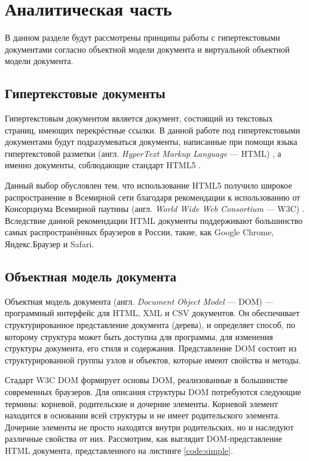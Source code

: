 \section{Аналитическая часть} \label{analysis}

В данном разделе будут рассмотрены принципы работы с гипертекстовыми документами согласно объектной модели документа и виртуальной объектной модели документа.

\subsection{Гипертекстовые документы}

Гипертекстовым \cite{hypertext} документом является документ, состоящий из текстовых страниц, имеющих перекрёстные ссылки. 
В данной работе под гипертекстовыми документами будут подразумеваться документы, написанные при помощи языка гипертекстовой разметки (англ. \textit{HyperText Markup Language} --- HTML) \cite{html}, а именно документы, соблюдающие стандарт HTML5 \cite{html-doc}.


Данный выбор обусловлен тем, что использование HTML5 получило широкое распространение в Всемирной сети \cite{internet} благодаря рекомендации \cite{html-recommendation} к использованию от Консорциума Всемирной паутины (англ. \textit{World Wide Web \newline Consortium} --- W3C) \cite{w3c}.
Вследствие данной рекомендации HTML документы поддерживают большинство самых распространённых браузеров в России, такие, как Google Chrome, Яндекс.Браузер и Safari. 

\subsection{Объектная модель документа}
Объектная модель документа (англ. \textit{Document Object Model} --- DOM) \cite{dom} --- программный интерфейс для HTML, XML и CSV документов. 
Он обеспечивает структурированное представление документа (дерева), и определяет способ, по которому структура может быть доступна для программы, для изменения структуры документа, его стиля и содержания.
Представление DOM состоит из структурированной группы узлов и объектов, которые имеют свойства и методы.

Стадарт W3C DOM \cite{dom-doc} формирует основы DOM, реализованные в большинстве современных браузеров. 
Для описания структуры DOM потребуются следующие термины: корневой, родительские и дочерние элементы. 
Корневой элемент находится в основании всей структуры и не имеет родительского элемента.
Дочерние элементы не просто находятся внутри родительских, но и наследуют различные свойства от них.
Рассмотрим, как выглядит DOM-представление HTML документа, представленного на листинге \ref{code:simple}. 

